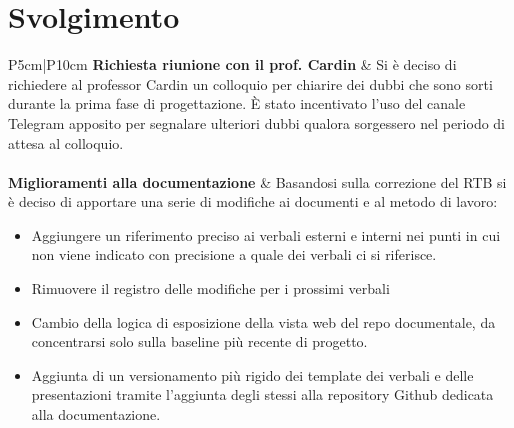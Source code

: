 \documentclass[a4paper,12pt]{article}
\begin{document}
    \section{Svolgimento}
        \begin{longtable}{P{5cm}|P{10cm}} 
            \textbf{Richiesta riunione con il prof. Cardin} & Si è deciso di richiedere al professor Cardin un 
            colloquio per chiarire dei dubbi che sono sorti durante la prima fase di progettazione.
            È stato incentivato l'uso del canale Telegram apposito per segnalare ulteriori dubbi qualora
            sorgessero nel periodo di attesa al colloquio.\\\\

            \textbf{Miglioramenti alla documentazione} & Basandosi sulla correzione del RTB si è deciso di apportare una serie di modifiche ai 
            documenti e al metodo di lavoro:
            \begin{itemize}
                \item Aggiungere un riferimento preciso ai verbali esterni e interni nei punti in cui non viene 
                    indicato con precisione a quale dei verbali ci si riferisce.
                \item Rimuovere il registro delle modifiche per i prossimi verbali
                \item Cambio della logica di esposizione della vista web del repo documentale, da concentrarsi
                    solo sulla baseline più recente di progetto.
                \item Aggiunta di un versionamento più rigido dei template dei verbali e delle presentazioni tramite
                    l'aggiunta degli stessi alla repository Github dedicata alla documentazione.
            \end{itemize}\\\\


\end{longtable}
\end{document}

